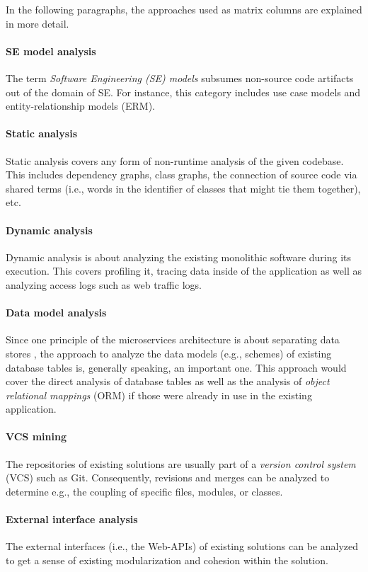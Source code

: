 \documentclass[12pt,a4paper]{report}
\begin{document}
In the following paragraphs, the approaches used as matrix columns are
explained in more detail. \paragraph{SE model analysis} The term \textit{
Software Engineering (SE) models} subsumes non\hyp source code artifacts out of
the domain of SE. For instance, this category includes use case models and
entity-relationship models (ERM). \paragraph{Static analysis} Static analysis
covers any form of non\hyp runtime analysis of the given codebase. This
includes dependency graphs, class graphs, the connection of source code via
shared terms (i.e., words in the identifier of classes that might tie them
together), etc. \paragraph{Dynamic analysis} Dynamic analysis is about
analyzing the existing monolithic software during its execution. This covers
profiling it, tracing data inside of the application as well as analyzing
access logs such as web traffic logs. \paragraph{Data model analysis} Since one
principle of the microservices architecture is about separating data stores
\cite{ms-microservices}, the approach to analyze the data models (e.g.,
schemes) of existing database tables is, generally speaking, an important one.
This approach would cover the direct analysis of database tables as well as the
analysis of \textit{object relational mappings} (ORM) if those were already in
use in the existing application. \paragraph{VCS mining} The repositories of
existing solutions are usually part of a \textit{version control system} (VCS)
such as Git. Consequently, revisions and merges can be analyzed to determine
e.g., the coupling of specific files, modules, or classes. \paragraph{External
interface analysis} The external interfaces (i.e., the Web-APIs) of existing
solutions can be analyzed to get a sense of existing modularization and
cohesion within the solution.
\end{document}
